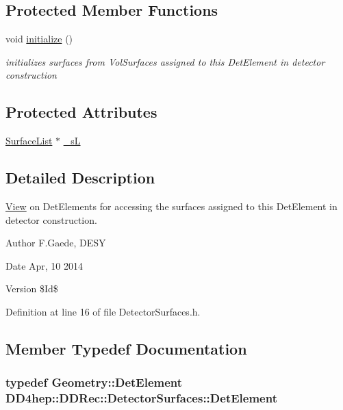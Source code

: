 \subsection*{Protected Member Functions}
\begin{DoxyCompactItemize}
\item 
void \hyperlink{class_d_d4hep_1_1_d_d_rec_1_1_detector_surfaces_a7db2dd282079291d6c99275db180fd81}{initialize} ()
\begin{DoxyCompactList}\small\item\em initializes surfaces from VolSurfaces assigned to this DetElement in detector construction \item\end{DoxyCompactList}\end{DoxyCompactItemize}
\subsection*{Protected Attributes}
\begin{DoxyCompactItemize}
\item 
\hyperlink{class_d_d4hep_1_1_d_d_rec_1_1_surface_list}{SurfaceList} $\ast$ \hyperlink{class_d_d4hep_1_1_d_d_rec_1_1_detector_surfaces_ae6635879dddb6bd5dd2624c2e38f46a8}{\_\-sL}
\end{DoxyCompactItemize}


\subsection{Detailed Description}
\hyperlink{class_d_d4hep_1_1_view}{View} on DetElements for accessing the surfaces assigned to this DetElement in detector construction.

\begin{DoxyAuthor}{Author}
F.Gaede, DESY 
\end{DoxyAuthor}
\begin{DoxyDate}{Date}
Apr, 10 2014 
\end{DoxyDate}
\begin{DoxyVersion}{Version}
\$Id\$ 
\end{DoxyVersion}


Definition at line 16 of file DetectorSurfaces.h.

\subsection{Member Typedef Documentation}
\hypertarget{class_d_d4hep_1_1_d_d_rec_1_1_detector_surfaces_a1b81ef076a40865045f404fb3e360562}{
\subsubsection[{DetElement}]{\setlength{\rightskip}{0pt plus 5cm}typedef {\bf Geometry::DetElement} {\bf DD4hep::DDRec::DetectorSurfaces::DetElement}}}
\label{class_d_d4hep_1_1_d_d_rec_1_1_detector_surfaces_a1b81ef076a40865045f404fb3e360562}


